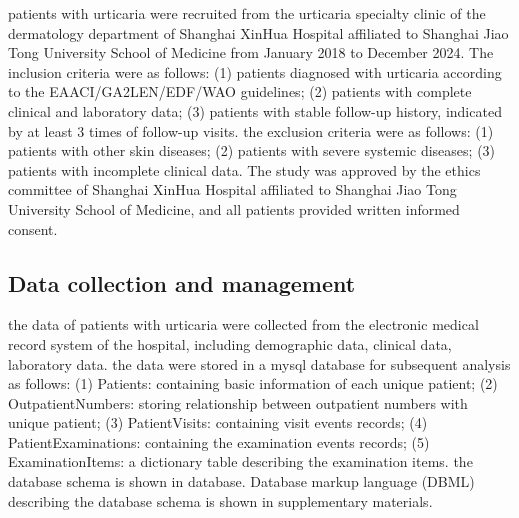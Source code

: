 \documentclass[final,1p,times,authoryear]{elsarticle}
\begin{document}
patients with urticaria were recruited from the urticaria specialty clinic of the dermatology department of Shanghai XinHua Hospital affiliated to Shanghai Jiao Tong University School of Medicine from January 2018 to December 2024. The inclusion criteria were as follows: (1) patients diagnosed with urticaria according to the EAACI/GA2LEN/EDF/WAO guidelines\citep{Zuberbier2021The}; (2) patients with complete clinical and laboratory data; (3) patients with stable follow-up history, indicated by at least 3 times of follow-up visits. the exclusion criteria were as follows: (1) patients with other skin diseases; (2) patients with severe systemic diseases; (3) patients with incomplete clinical data. The study was approved by the ethics committee of Shanghai XinHua Hospital affiliated to Shanghai Jiao Tong University School of Medicine, and all patients provided written informed consent.

\subsection{Data collection and management}\label{Data}

the data of patients with urticaria were collected from the electronic medical record system of the hospital, including demographic data, clinical data, laboratory data. the data were stored in a mysql database for subsequent analysis as follows: (1) Patients: containing basic information of each unique patient; (2) OutpatientNumbers: storing relationship between outpatient numbers with unique patient; (3) PatientVisits: containing visit events records; (4) PatientExaminations: containing the examination events records; (5) ExaminationItems: a dictionary table describing the examination items. the database schema is shown in database. Database 
markup language (DBML) describing the database schema is shown in supplementary materials.
\end{document}
